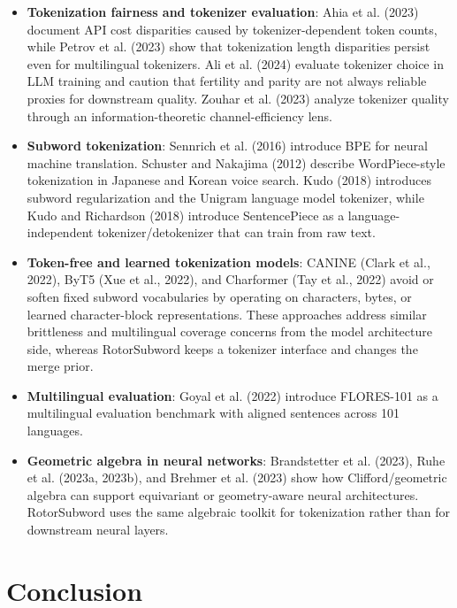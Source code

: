\documentclass[11pt]{article}
\begin{document}
\begin{itemize}
  \item \textbf{Tokenization fairness and tokenizer evaluation}: Ahia et al. (2023) document API cost disparities caused by tokenizer-dependent token counts, while Petrov et al. (2023) show that tokenization length disparities persist even for multilingual tokenizers. Ali et al. (2024) evaluate tokenizer choice in LLM training and caution that fertility and parity are not always reliable proxies for downstream quality. Zouhar et al. (2023) analyze tokenizer quality through an information-theoretic channel-efficiency lens.
  \item \textbf{Subword tokenization}: Sennrich et al. (2016) introduce BPE for neural machine translation. Schuster and Nakajima (2012) describe WordPiece-style tokenization in Japanese and Korean voice search. Kudo (2018) introduces subword regularization and the Unigram language model tokenizer, while Kudo and Richardson (2018) introduce SentencePiece as a language-independent tokenizer/detokenizer that can train from raw text.
  \item \textbf{Token-free and learned tokenization models}: CANINE (Clark et al., 2022), ByT5 (Xue et al., 2022), and Charformer (Tay et al., 2022) avoid or soften fixed subword vocabularies by operating on characters, bytes, or learned character-block representations. These approaches address similar brittleness and multilingual coverage concerns from the model architecture side, whereas RotorSubword keeps a tokenizer interface and changes the merge prior.
  \item \textbf{Multilingual evaluation}: Goyal et al. (2022) introduce FLORES-101 as a multilingual evaluation benchmark with aligned sentences across 101 languages.
  \item \textbf{Geometric algebra in neural networks}: Brandstetter et al. (2023), Ruhe et al. (2023a, 2023b), and Brehmer et al. (2023) show how Clifford/geometric algebra can support equivariant or geometry-aware neural architectures. RotorSubword uses the same algebraic toolkit for tokenization rather than for downstream neural layers.
\end{itemize}

\section{Conclusion}
\end{document}
